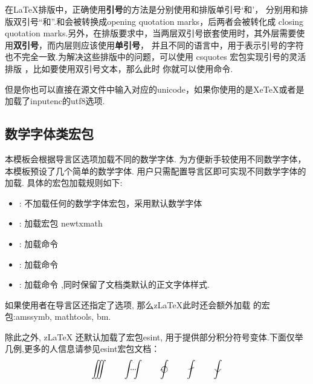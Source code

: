 在\LaTeX{}排版中，正确使用{\bf 引号}的方法是分别使用和排版单引号`和'，
分别用和排版双引号``和''.和会被转换成opening quotation marks，后两者会被转化成
closing quotation marks.另外，在排版要求中，当两层双引号嵌套使用时，其外层需要使用{\bf 双引号}，而内层则应该使用{\bf 单引号}，
并且不同的语言中，用于表示引号的字符也不完全一致.为解决这些排版中的问题，可以使用 {csquotes} 宏包实现引号的灵活排版
，比如要使用双引号文本，那么此时
你就可以使用命令.

\begin{remark}
  但是你也可以直接在源文件中输入对应的unicode，如果你使用的是Xe\TeX{}或者是加载了inputenc的utf8选项.
\end{remark}

\subsection{数学字体类宏包}
本模板会根据导言区选项加载不同的数学字体. 为方便新手较使用不同数学字体，本模板预设了几个简单的数学字体.
用户只需配置导言区即可实现不同数学字体的加载. 具体的宏包加载规则如下:
\begin{itemize}
    \item {}: 不加载任何的数学字体宏包，采用默认数学字体
    \item {}: 加载宏包 {newtxmath}
    \item {}: 加载命令 
    \item {}: 加载命令 \par
    \item {}: 加载命令 \cmd[F]{\RequirePackage{mathpazo}},同时保留了文档类默认的正文字体样式.
\end{itemize}

如果使用者在导言区还指定了选项, 那么z\LaTeX{}此时还会额外加载
的宏包:{amssymb, mathtools, bm}.

除此之外, z\LaTeX{} 还默认加载了宏包{esint}, 用于提供部分积分符号变体.下面仅举几例,更多的人信息请参见{esint}宏包文档：
\[
  \iiint\qquad 
  \idotsint\qquad
  \ointclockwise\qquad
  \fint\qquad
  \landdownint
\]

